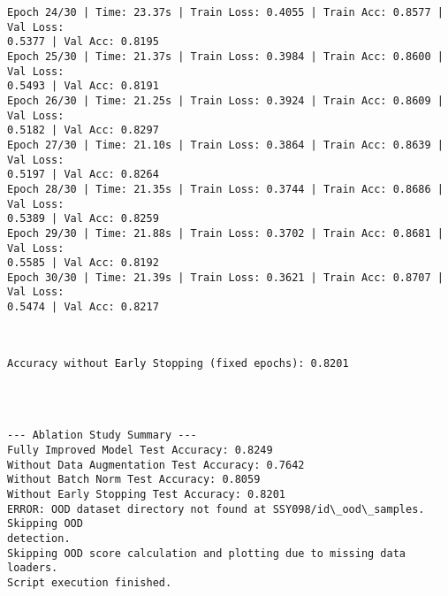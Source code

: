 \documentclass[11pt]{article}
\makeatletter
\newcommand{\boxspacing}{\kern\kvtcb@left@rule\kern\kvtcb@boxsep}
\newcommand{\prompt}[4]{
        {\ttfamily\llap{{\color{#2}[#3]:\hspace{3pt}#4}}\vspace{-\baselineskip}}
    }
\makeatother
\begin{document}
\begin{Verbatim}[commandchars=\\\{\}]
Epoch 24/30 | Time: 23.37s | Train Loss: 0.4055 | Train Acc: 0.8577 | Val Loss:
0.5377 | Val Acc: 0.8195
Epoch 25/30 | Time: 21.37s | Train Loss: 0.3984 | Train Acc: 0.8600 | Val Loss:
0.5493 | Val Acc: 0.8191
Epoch 26/30 | Time: 21.25s | Train Loss: 0.3924 | Train Acc: 0.8609 | Val Loss:
0.5182 | Val Acc: 0.8297
Epoch 27/30 | Time: 21.10s | Train Loss: 0.3864 | Train Acc: 0.8639 | Val Loss:
0.5197 | Val Acc: 0.8264
Epoch 28/30 | Time: 21.35s | Train Loss: 0.3744 | Train Acc: 0.8686 | Val Loss:
0.5389 | Val Acc: 0.8259
Epoch 29/30 | Time: 21.88s | Train Loss: 0.3702 | Train Acc: 0.8681 | Val Loss:
0.5585 | Val Acc: 0.8192
Epoch 30/30 | Time: 21.39s | Train Loss: 0.3621 | Train Acc: 0.8707 | Val Loss:
0.5474 | Val Acc: 0.8217
    \end{Verbatim}

    \begin{center}
    \end{center}
    { \hspace*{\fill} \\}
    
    \begin{Verbatim}[commandchars=\\\{\}]
Accuracy without Early Stopping (fixed epochs): 0.8201
    \end{Verbatim}

    \begin{center}
    \end{center}
    { \hspace*{\fill} \\}
    
    \begin{Verbatim}[commandchars=\\\{\}]

--- Ablation Study Summary ---
Fully Improved Model Test Accuracy: 0.8249
Without Data Augmentation Test Accuracy: 0.7642
Without Batch Norm Test Accuracy: 0.8059
Without Early Stopping Test Accuracy: 0.8201
ERROR: OOD dataset directory not found at SSY098/id\_ood\_samples. Skipping OOD
detection.
Skipping OOD score calculation and plotting due to missing data loaders.
Script execution finished.
    \end{Verbatim}

    \begin{tcolorbox}[breakable, size=fbox, boxrule=1pt, pad at break*=1mm,colback=cellbackground, colframe=cellborder]
\prompt{In}{incolor}{ }{\boxspacing}
\begin{Verbatim}[commandchars=\\\{\}]

\end{Verbatim}
\end{tcolorbox}


    
    
    
\end{document}

